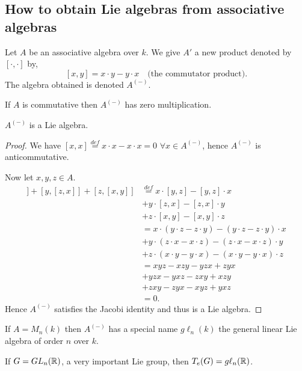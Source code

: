 \subsection{How to obtain Lie algebras from associative algebras}

Let $A$ be an associative algebra over $k$. We give $A'$ a new product denoted by $[\cdot,\cdot]$ by,
\[
  [x,y] = x \cdot y - y \cdot x \quad \text{(the commutator product)}.
\]
The algebra obtained is denoted $A^{(-)}$.

\begin{remark}
  If $A$ is commutative then $A^{(-)}$ has zero multiplication.
\end{remark}

\begin{proposition}
  $A^{(-)}$ is a Lie algebra.
\end{proposition}

\begin{proof}
  We have $[x,x] \overset{def}{=} x \cdot x - x \cdot x = 0$ $\forall x \in A^{(-)}$, hence $A^{(-)}$ is anticommutative.

  Now let $x,y,z \in A$.
  \begin{align*}
    [x,[y,z]] + [y,[z,x]] + [z,[x,y]] &\overset{def}{=} x \cdot [y,z] - [y,z] \cdot x\\
    &+ y \cdot [z,x] - [z,x] \cdot y\\
    &+ z \cdot [x,y] - [x,y] \cdot z\\
    &= x \cdot (y \cdot z - z \cdot y) - (y \cdot z - z \cdot y) \cdot x\\
    &+ y \cdot (z \cdot x - x \cdot z) - (z \cdot x - x \cdot z) \cdot y\\
    &+ z \cdot (x \cdot y - y \cdot x) - (x \cdot y - y \cdot x) \cdot z\\
    &= xyz - xzy - yzx + zyx\\
    &+ yzx - yxz - zxy + xzy\\
    &+ zxy - zyx - xyz + yxz\\
    &= 0.
  \end{align*}
  Hence $A^{(-)}$ satisfies the Jacobi identity and thus is a Lie algebra.
\end{proof}

If $A = M_n(k)$ then $A^{(-)}$ has a special name $g\ell_n(k)$ the general linear Lie algebra of order $n$ over $k$.

\begin{remark}
  If $G=GL_n(\mathbb{R})$, a very important Lie group, then $T_e(G) = g\ell_n(\mathbb{R})$.
\end{remark}
